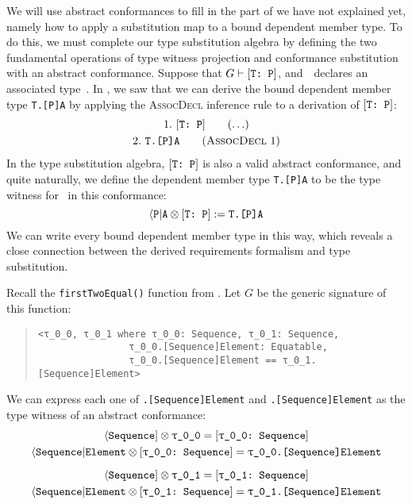 \documentclass[../generics]{subfiles}
\begin{document}
We will use abstract conformances to fill in the part of  we have not explained yet, namely how to apply a substitution map to a bound dependent member type. To do this, we must complete our type substitution algebra by defining the two fundamental operations of type witness projection and conformance substitution with an abstract conformance. Suppose that $G\vdash[\texttt{T:~P}]$, and~\tP\ declares an associated type~\nA. In , we saw that we can derive the bound dependent member type \texttt{T.[P]A} by applying the \textsc{AssocDecl} inference rule to a derivation of $[\texttt{T:~P}]$:
\begin{gather*}
\AnyStep{\TP}{1}\\
\AssocDeclStep{1}{T.[P]A}{2}
\end{gather*}
In the type substitution algebra, $[\texttt{T:~P}]$ is also a valid abstract conformance, and quite naturally, we define the dependent member type \texttt{T.[P]A} to be the type witness for \nA\ in this conformance:
\[\langle\texttt{P}|\texttt{A} \otimes [\texttt{T:~P}] := \texttt{T.[P]A}\]
We can write every bound dependent member type in this way, which reveals a close connection between the derived requirements formalism and type substitution.
\begin{example}\label{abstract conformance example}
Recall the \texttt{firstTwoEqual()} function from . Let $G$ be the generic signature of this function:
\begin{quote}
\begin{verbatim}
<τ_0_0, τ_0_1 where τ_0_0: Sequence, τ_0_1: Sequence,
                τ_0_0.[Sequence]Element: Equatable,
                τ_0_0.[Sequence]Element == τ_0_1.[Sequence]Element>
\end{verbatim}
\end{quote}
We can express each one of \texttt{\rT.[Sequence]Element} and \texttt{\rU.[Sequence]Element} as the type witness of an abstract conformance:
\begin{gather*}
\PSequence \otimes \texttt{\rT} = \rTSequence\\
\AElement \otimes \rTSequence = \texttt{\rT.[Sequence]Element}\\[\medskipamount]
\PSequence \otimes \texttt{\rU} = \rUSequence\\
\AElement \otimes \rUSequence = \texttt{\rU.[Sequence]Element}
\end{gather*}
\end{example}
\end{document}
